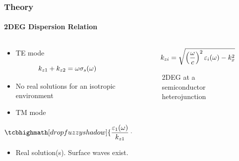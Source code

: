 \documentclass[mathserif,18pt,xcolor=table]{beamer}
\begin{document}
  \begin{frame}

    \frametitle{Theory}
    \framesubtitle{2DEG Dispersion Relation}
    \vspace*{-.5cm}
    \begin{columns} %
      \begin{column}[T]{.5\textwidth}
        \begin{itemize}
          \item TE mode
        \end{itemize}
        \begin{equation} \nonumber
          k_{z1} + k_{z2} = \omega \sigma_s(\omega)
          \label{eq:disp_TE_two}
        \end{equation}
        \begin{itemize}
          \item[] No real solutions for an isotropic environment
        \end{itemize}
        \begin{itemize}
          \item TM mode
        \end{itemize}
        \begin{equation} \nonumber
          \tcbhighmath[drop fuzzy shadow]{\frac{\E_1(\O)}{k_{z1}} + \frac{\E_2(\O)}{k_{z2}} = -\frac{\sigma_s(\O)}{\O}}
          \label{eq:disp_TM_two}
        \end{equation}
        \begin{itemize}
          \item[] Real solution(s). Surface waves exist.
        \end{itemize}
      \end{column}
      \begin{column}[T]{.5\textwidth}
        \begin{equation} \nonumber
          \begin{split}
            k_{zi} = \sqrt{\left(\frac{\omega}{c}\right)^2 \varepsilon_i(\omega) -  k_x^2}
          \end{split}
          \label{eq:kz}
        \end{equation}
        \begin{figure}
          \def\svgwidth{\linewidth}
          
          \caption{2DEG at a semiconductor heterojunction}
        \end{figure}
        \end{column}%
      \end{columns}
    \end{frame}
\end{document}
